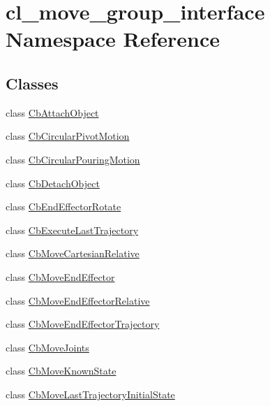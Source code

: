 \hypertarget{namespacecl__move__group__interface}{}\section{cl\+\_\+move\+\_\+group\+\_\+interface Namespace Reference}
\label{namespacecl__move__group__interface}
\subsection*{Classes}
\begin{DoxyCompactItemize}
\item 
class \hyperlink{classcl__move__group__interface_1_1CbAttachObject}{Cb\+Attach\+Object}
\item 
class \hyperlink{classcl__move__group__interface_1_1CbCircularPivotMotion}{Cb\+Circular\+Pivot\+Motion}
\item 
class \hyperlink{classcl__move__group__interface_1_1CbCircularPouringMotion}{Cb\+Circular\+Pouring\+Motion}
\item 
class \hyperlink{classcl__move__group__interface_1_1CbDetachObject}{Cb\+Detach\+Object}
\item 
class \hyperlink{classcl__move__group__interface_1_1CbEndEffectorRotate}{Cb\+End\+Effector\+Rotate}
\item 
class \hyperlink{classcl__move__group__interface_1_1CbExecuteLastTrajectory}{Cb\+Execute\+Last\+Trajectory}
\item 
class \hyperlink{classcl__move__group__interface_1_1CbMoveCartesianRelative}{Cb\+Move\+Cartesian\+Relative}
\item 
class \hyperlink{classcl__move__group__interface_1_1CbMoveEndEffector}{Cb\+Move\+End\+Effector}
\item 
class \hyperlink{classcl__move__group__interface_1_1CbMoveEndEffectorRelative}{Cb\+Move\+End\+Effector\+Relative}
\item 
class \hyperlink{classcl__move__group__interface_1_1CbMoveEndEffectorTrajectory}{Cb\+Move\+End\+Effector\+Trajectory}
\item 
class \hyperlink{classcl__move__group__interface_1_1CbMoveJoints}{Cb\+Move\+Joints}
\item 
class \hyperlink{classcl__move__group__interface_1_1CbMoveKnownState}{Cb\+Move\+Known\+State}
\item 
class \hyperlink{classcl__move__group__interface_1_1CbMoveLastTrajectoryInitialState}{Cb\+Move\+Last\+Trajectory\+Initial\+State}

\end{DoxyCompactItemize}
